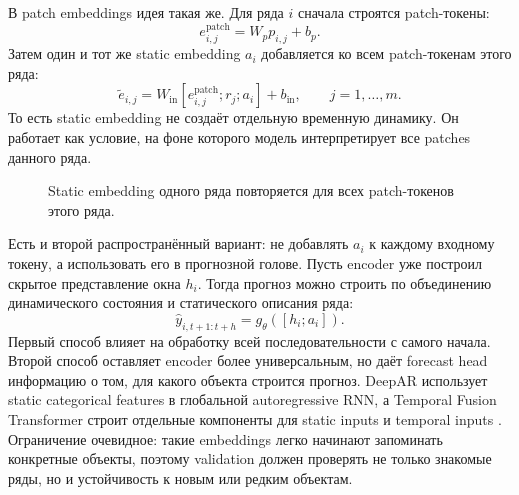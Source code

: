 \documentclass[12pt,fleqn]{article}
\begin{document}
В patch embeddings идея такая же.
Для ряда $i$ сначала строятся patch-токены:
\begin{equation}
  e_{i,j}^{\mathrm{patch}} = W_p p_{i,j} + b_p.
\end{equation}
Затем один и тот же static embedding $a_i$ добавляется ко всем patch-токенам этого ряда:
\begin{equation}
  \widetilde{e}_{i,j}
  =
  W_{\mathrm{in}}
  \left[
    e_{i,j}^{\mathrm{patch}};
    r_j;
    a_i
  \right]
  +
  b_{\mathrm{in}},
  \qquad
  j = 1, \ldots, m.
\end{equation}
То есть static embedding не создаёт отдельную временную динамику.
Он работает как условие, на фоне которого модель интерпретирует все patches данного ряда.

\begin{figure}[!ht]
\centering
{}
\caption{Static embedding одного ряда повторяется для всех patch-токенов этого ряда.}
\end{figure}

Есть и второй распространённый вариант: не добавлять $a_i$ к каждому входному токену, а использовать его в прогнозной голове.
Пусть encoder уже построил скрытое представление окна $h_i$.
Тогда прогноз можно строить по объединению динамического состояния и статического описания ряда:
\begin{equation}
  \widehat{y}_{i,t+1:t+h}
  =
  g_\theta([h_i; a_i]).
\end{equation}
Первый способ влияет на обработку всей последовательности с самого начала.
Второй способ оставляет encoder более универсальным, но даёт forecast head информацию о том, для какого объекта строится прогноз.
DeepAR использует static categorical features в глобальной autoregressive RNN, а Temporal Fusion Transformer строит отдельные компоненты для static inputs и temporal inputs \cite{salinas2017,lim2021tft}.
Ограничение очевидное: такие embeddings легко начинают запоминать конкретные объекты, поэтому validation должен проверять не только знакомые ряды, но и устойчивость к новым или редким объектам.
\end{document}
